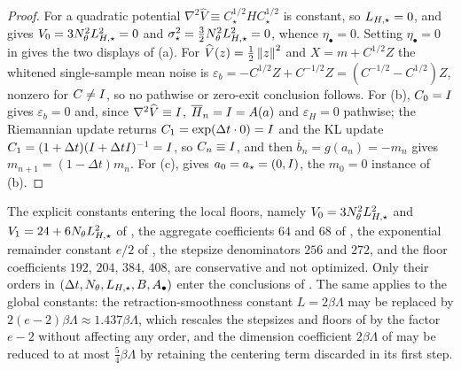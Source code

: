 \begin{proof}
For a quadratic potential $\nabla^2\widehat V\equiv C_\star^{1/2}HC_\star^{1/2}$ is constant, so
$L_{H,\star}=0$, and  gives $V_0=3N_\theta^2L_{H,\star}^2=0$ and
$\sigma_\star^2=\tfrac32N_\theta^2L_{H,\star}^2=0$, whence $\eta_\bullet=0$. Setting $\eta_\bullet=0$ in
 gives the two displays of (a). For
$\widehat V(z)=\tfrac12\left\lVert z\right\rVert^2$ and $X=m+C^{1/2}Z$ the whitened single-sample mean noise is
$\varepsilon_b=-C^{1/2}Z+C^{-1/2}Z=(C^{-1/2}-C^{1/2})Z$, nonzero for $C\neq I$, so no pathwise or
zero-exit conclusion follows. For (b), $C_0=I$ gives $\varepsilon_b=0$ and, since
$\nabla^2\widehat V\equiv I$, $\overline H_n=I=A(a)$ and $\varepsilon_H=0$ pathwise; the Riemannian
update returns $C_1=\exp(\Delta t\cdot0)=I$ and the KL update
$C_1=(1+\Delta t)(I+\Delta tI)^{-1}=I$, so $C_n\equiv I$, and then
$\overline b_n=g(a_n)=-m_n$ gives $m_{n+1}=(1-\Delta t)m_n$. For (c),  gives
$a_0=a_\star=(0,I)$, the $m_0=0$ instance of (b).
\end{proof}

\begin{remark}
\label{rem:stoch-constants}
The explicit constants entering the local floors, namely $V_0=3N_\theta^2L_{H,\star}^2$ and
$V_1=24+6N_\theta L_{H,\star}^2$ of , the aggregate coefficients $64$ and $68$ of
, the exponential remainder constant $e/2$ of
, the stepsize denominators $256$ and $272$, and the floor coefficients $192$,
$204$, $384$, $408$, are conservative and not optimized. Only their orders in
$(\Delta t,N_\theta,L_{H,\star},B,A_\bullet)$ enter the conclusions of . The same applies
to the global constants: the retraction-smoothness constant $L=2\beta\Lambda$ may be replaced by
$2(e-2)\beta\Lambda\approx1.437\beta\Lambda$, which rescales the stepsizes and floors of
 by the factor $e-2$ without affecting any order, and the
dimension coefficient $2\beta\Lambda$ of  may be reduced to at most
$\tfrac54\beta\Lambda$ by retaining the centering term discarded in its first step.
\end{remark}

